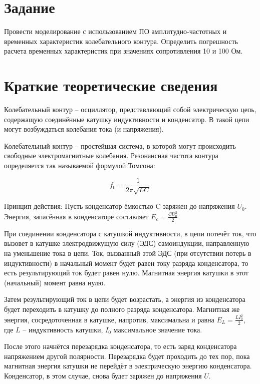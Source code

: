 \documentclass[a4paper,14pt]{article}
\begin{document}

\tableofcontents
\pagebreak

\section{Задание}

Провести моделирование с использованием ПО амплитудно-частотных и временных характеристик колебательного контура. Определить погрешность расчета временных характеристик при значениях сопротивления 10 и 100 Ом.

\section{Краткие теоретические сведения}

Колебательный контур -- осциллятор, представляющий собой электрическую цепь, содержащую соединённые катушку индуктивности и конденсатор. 
В такой цепи могут возбуждаться колебания тока (и напряжения).

Колебательный контур -- простейшая система, в которой могут происходить свободные электромагнитные колебания.
Резонансная частота контура определяется так называемой формулой Томсона:

\begin{equation}
f_0 = \frac{1}{2 \pi \sqrt{LC}}
\end{equation}

Принцип действия:
Пусть конденсатор ёмкостью C заряжен до напряжения $U_0$. 
Энергия, запасённая в конденсаторе составляет $E_c = \frac{C U_0^2}{2} $

При соединении конденсатора с катушкой индуктивности, в цепи потечёт ток, что вызовет в катушке электродвижущую силу (ЭДС) самоиндукции, направленную на уменьшение тока в цепи. 
Ток, вызванный этой ЭДС (при отсутствии потерь в индуктивности) в начальный момент будет равен току разряда конденсатора, то есть результирующий ток будет равен нулю. 
Магнитная энергия катушки в этот (начальный) момент равна нулю.

Затем результирующий ток в цепи будет возрастать, а энергия из конденсатора будет переходить в катушку до полного разряда конденсатора. 
Магнитная же энергия, сосредоточенная в катушке, напротив, максимальна и равна $E_L = \frac{L I_0^2}{2} $, где $L$ -- индуктивность катушки, $I_0$ максимальное значение тока.

После этого начнётся перезарядка конденсатора, то есть заряд конденсатора напряжением другой полярности.
Перезарядка будет проходить до тех пор, пока магнитная энергия катушки не перейдёт в электрическую энергию конденсатора.
Конденсатор, в этом случае, снова будет заряжен до напряжения $U$.
\end{document}
